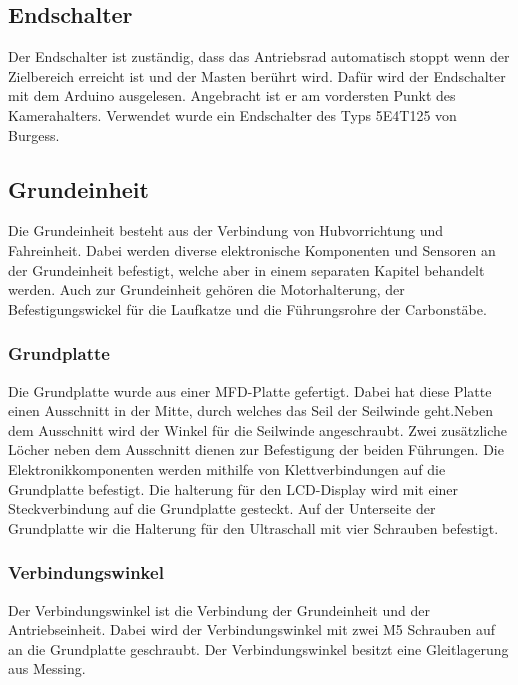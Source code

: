 \documentclass[a4paper]{report}
\begin{document}
\vspace{1em}

\subsection{Endschalter}
Der Endschalter ist zuständig, dass das Antriebsrad automatisch stoppt wenn der Zielbereich erreicht ist und der Masten berührt wird. Dafür wird der Endschalter mit dem Arduino ausgelesen. Angebracht ist er am vordersten Punkt des Kamerahalters. Verwendet wurde ein Endschalter des Typs 5E4T125 von Burgess.

\subsection{Grundeinheit}
\label{ssec:GrundeinheitBeschrieb}
Die Grundeinheit besteht aus der Verbindung von Hubvorrichtung und Fahreinheit. Dabei werden diverse elektronische Komponenten und Sensoren an der Grundeinheit befestigt, welche aber in einem separaten Kapitel behandelt werden. Auch zur Grundeinheit gehören die Motorhalterung, der Befestigungswickel für die Laufkatze und die Führungsrohre der Carbonstäbe.

\subsubsection{Grundplatte}
\label{sssec:GrundplatteBeschrieb}
Die Grundplatte wurde aus einer MFD-Platte gefertigt. Dabei hat diese Platte einen Ausschnitt in der Mitte, durch welches das Seil der Seilwinde geht.Neben dem Ausschnitt wird der Winkel für die Seilwinde angeschraubt. Zwei zusätzliche Löcher neben dem Ausschnitt dienen zur Befestigung der beiden Führungen. Die Elektronikkomponenten werden mithilfe von Klettverbindungen auf die Grundplatte befestigt. Die halterung für den LCD-Display wird mit einer Steckverbindung auf die Grundplatte gesteckt. Auf der Unterseite der Grundplatte wir die Halterung für den Ultraschall mit vier Schrauben befestigt.

\subsubsection{Verbindungswinkel}
\label{sssec:VerbindungswinkelBeschrieb}
Der Verbindungswinkel ist die Verbindung der Grundeinheit und der Antriebseinheit. Dabei wird der Verbindungswinkel mit zwei M5 Schrauben auf an die Grundplatte geschraubt. Der Verbindungswinkel besitzt eine Gleitlagerung aus Messing.
\end{document}
